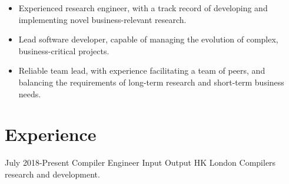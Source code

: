 \documentclass[12pt,a4paper,sans]{moderncv}
\begin{document}
\maketitle

\begin{itemize}
  \item Experienced research engineer, with a track record of developing and
    implementing novel business-relevant research.
  \item Lead software developer, capable of managing the evolution of complex, business-critical
    projects.
  \item Reliable team lead, with experience facilitating a team of peers, and
    balancing the requirements of long-term research and short-term business needs.
\end{itemize}

\section{Experience}

\cventry
{July 2018-Present}
{Compiler Engineer}
{Input Output HK}
{London}
{}
{
  Compilers research and development.
}
\end{document}
